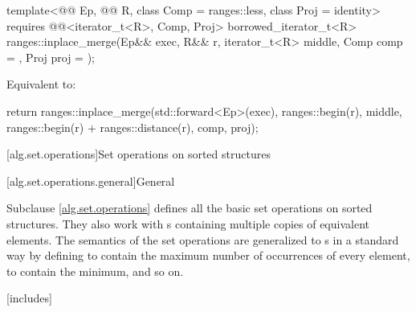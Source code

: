 \begin{itemdecl}
template<@@ Ep, @@ R, class Comp = ranges::less,
         class Proj = identity>
  requires @@<iterator_t<R>, Comp, Proj>
  borrowed_iterator_t<R>
    ranges::inplace_merge(Ep&& exec, R&& r, iterator_t<R> middle, Comp comp = {},
                          Proj proj = {});
\end{itemdecl}

\begin{itemdescr}
\pnum
\effects
Equivalent to:
\begin{codeblock}
return ranges::inplace_merge(std::forward<Ep>(exec), ranges::begin(r), middle,
                             ranges::begin(r) + ranges::distance(r),
                             comp, proj);
\end{codeblock}
\end{itemdescr}

[alg.set.operations]{Set operations on sorted structures}

[alg.set.operations.general]{General}

\pnum
Subclause \ref{alg.set.operations} defines all the basic set operations on sorted structures.
They also work with s
containing multiple copies of equivalent elements.
The semantics of the set operations are generalized to s
in a standard way by defining 
to contain the maximum number of occurrences of every element,
 to contain the minimum, and so on.

[includes]{}

